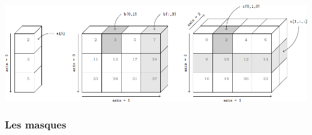 \documentclass[10pt,fleqn]{article} %
\begin{document}
\begin{center}
\includegraphics[width=.95\linewidth]{images/cubes}
\end{center}

\subsubsection{Les masques}
\end{document}
